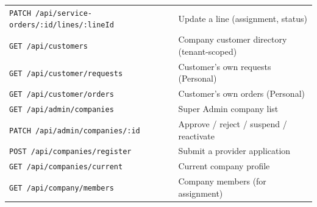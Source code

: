 \documentclass[11pt,a4paper]{article}
\begin{document}
\begin{longtable}{@{}L{6.4cm}L{8.2cm}@{}}
  \texttt{PATCH /api/service-orders/:id/lines/:lineId} & Update a line (assignment, status) \\
  \texttt{GET  /api/customers} & Company customer directory (tenant-scoped) \\
  \texttt{GET  /api/customer/requests} & Customer's own requests (Personal) \\
  \texttt{GET  /api/customer/orders} & Customer's own orders (Personal) \\
  \texttt{GET  /api/admin/companies} & Super Admin company list \\
  \texttt{PATCH /api/admin/companies/:id} & Approve / reject / suspend / reactivate \\
  \texttt{POST /api/companies/register} & Submit a provider application \\
  \texttt{GET  /api/companies/current} & Current company profile \\
  \texttt{GET  /api/company/members} & Company members (for assignment) \\
  \bottomrule
\end{longtable}
\end{document}
